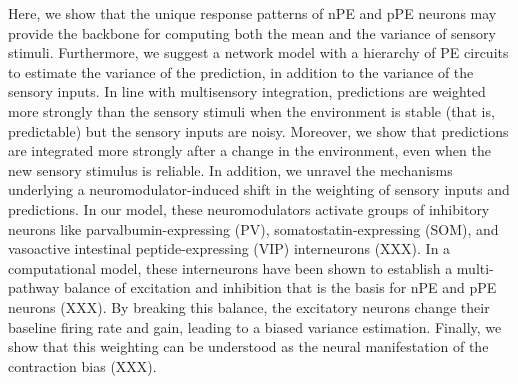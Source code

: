 \documentclass[10pt,a4paper]{article}
\begin{document}
Here, we show that the unique response patterns of nPE and pPE neurons may provide the backbone for computing both the mean and the variance of sensory stimuli. Furthermore, we suggest a network model with a hierarchy of PE circuits to estimate the variance of the prediction, in addition to the variance of the sensory inputs. In line with multisensory integration, predictions are weighted more strongly than the sensory stimuli when the environment is stable (that is, predictable) but the sensory inputs are noisy. Moreover, we show that predictions are integrated more strongly after a change in the environment, even when the new sensory stimulus is reliable. In addition, we unravel the mechanisms underlying a neuromodulator-induced shift in the weighting of sensory inputs and predictions. In our model, these neuromodulators activate groups of inhibitory neurons like parvalbumin-expressing (PV), somatostatin-expressing (SOM), and vasoactive intestinal peptide-expressing (VIP) interneurons (XXX). In a computational model, these interneurons have been shown to establish a multi-pathway balance of excitation and inhibition that is the basis for nPE and pPE neurons (XXX). By breaking this balance, the excitatory neurons change their baseline firing rate and gain, leading to a biased variance estimation. Finally, we show that this weighting can be understood as the neural manifestation of the contraction bias (XXX). 
\end{document}
